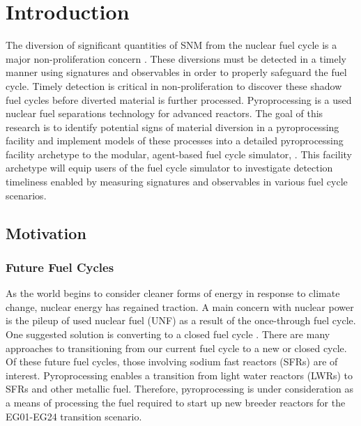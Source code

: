 \chapter[Introduction]{Introduction}
The diversion of significant quantities of \gls{SNM} from the nuclear fuel cycle is a major non-proliferation 
concern \cite{noauthor_serving_2017}. These diversions must be detected in a timely manner using signatures and observables in 
order to properly safeguard the fuel cycle. Timely detection is critical in non-proliferation to discover these shadow fuel cycles
before diverted material is further processed. Pyroprocessing is a used nuclear fuel separations technology for advanced reactors. 
The goal of this research is to identify potential signs of material diversion in a pyroprocessing facility and implement models 
of these processes into a detailed pyroprocessing facility archetype to the modular, agent-based fuel cycle simulator, \Cyclus \cite{huff_fundamental_2016}. This facility archetype will equip users of the \Cyclus fuel cycle simulator to investigate 
detection timeliness enabled by measuring signatures and observables in various fuel cycle scenarios.

\section{Motivation}


\subsection{Future Fuel Cycles}
As the world begins to consider cleaner forms of energy in response to climate change, nuclear energy has regained traction. A main
concern with nuclear power is the pileup of used nuclear fuel (UNF) as a result of the once-through fuel cycle. 
One suggested solution is converting to a closed fuel cycle \cite{wigeland_nuclear_2014}. There are many approaches to transitioning from our current
fuel cycle to a new or closed cycle. Of these future fuel cycles, those involving sodium fast reactors (SFRs) are of interest. 
Pyroprocessing enables a transition from light water reactors (LWRs) to SFRs and other metallic fuel.
Therefore, pyroprocessing is under consideration as a means of processing the fuel required to start up new breeder reactors for
the EG01-EG24 transition scenario.


